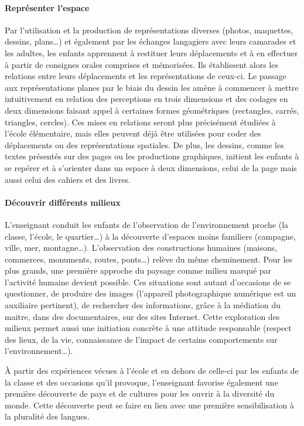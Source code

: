 \paragraph{Représenter l’espace}
Par l’utilisation et la production de représentations diverses (photos, maquettes, dessins, plans\dots) et également par les échanges langagiers avec leurs camarades et les adultes, les enfants apprennent à restituer leurs déplacements et à en effectuer à partir de consignes orales comprises et mémorisées. Ils établissent alors les relations entre leurs déplacements et les représentations de ceux-ci. Le passage aux représentations planes par le biais du dessin les amène à commencer à mettre intuitivement en relation des perceptions en trois dimensions et des codages en deux dimensions faisant appel à certaines formes géométriques (rectangles, carrés, triangles, cercles). Ces mises en relations seront plus précisément étudiées à l’école élémentaire, mais elles peuvent déjà être utilisées pour coder des déplacements ou des représentations spatiales. De plus, les dessins, comme les textes présentés sur des pages ou les productions graphiques, initient les enfants à se repérer et à s’orienter dans un espace à deux dimensions, celui de la page mais aussi celui des cahiers et des livres.

\paragraph{Découvrir différents milieux}
L’enseignant conduit les enfants de l'observation de l'environnement proche (la classe, l'école, le quartier\dots) à la découverte d'espaces moins familiers (campagne, ville, mer, montagne\dots). L'observation des constructions humaines (maisons, commerces, monuments, routes, ponts\dots) relève du même cheminement. Pour les plus grands, une première approche du paysage comme milieu marqué par l'activité humaine devient possible. Ces situations sont autant d'occasions de se questionner, de produire des images (l’appareil photographique numérique est un auxiliaire pertinent), de rechercher des informations, grâce à la médiation du maitre, dans des documentaires, sur des sites Internet. Cette exploration des milieux permet aussi une initiation concrète à une attitude responsable (respect des lieux, de la vie, connaissance de l’impact de certains comportements sur l'environnement\dots). 

À partir des expériences vécues à l’école et en dehors de celle-ci par les enfants de la classe et des occasions qu’il provoque, l’enseignant favorise également une première découverte de pays et de cultures pour les ouvrir à la diversité du monde. Cette découverte peut se faire en lien avec une première sensibilisation à la pluralité des langues. 

